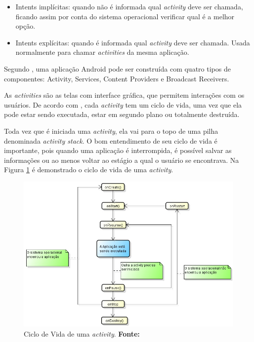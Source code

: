 	\begin{itemize}
	  
	  \item Intents implícitas: quando não é informada qual \textit{activity} deve
	  ser chamada, ficando assim por conta do sistema operacional verificar qual é a
	  melhor opção.
	  
	  \item Intents explícitas: quando é informada qual \textit{activity} deve ser chamada.
	  Usada normalmente para chamar \textit{activities} da mesma aplicação.
	  
	\end{itemize}
	
	\par Segundo , uma aplicação Android pode ser construída
com quatro tipos de componentes: Activity, Services, Content Providers e
Broadcast Receivers.

	\par As \textit{activities} são as telas com interface gráfica, que permitem
interações com os usuários. De acordo com , cada
\textit{activity} tem um ciclo de vida, uma vez que ela pode estar sendo
executada, estar em segundo plano ou totalmente destruída.

	\par Toda vez que é iniciada uma \textit{activity}, ela vai para o topo de uma pilha
denominada \textit{activity stack}. O bom entendimento de seu ciclo de vida é
importante, pois quando uma aplicação é interrompida, é possível salvar as
informações ou ao menos voltar ao estágio a qual o usuário se encontrava. Na
Figura \ref{fig:qt1} é demonstrado o ciclo de vida de uma \textit{activity}.

	\begin{figure}[h!]
		\centerline{\includegraphics[scale=0.8]{./imagens/1_q_teorico/qt1.png}}
		\caption[Ciclo de Vida de uma activity]{Ciclo de Vida de uma
		\textit{activity}.
		 \textbf{Fonte:}}
		\label{fig:qt1}
	\end{figure}

